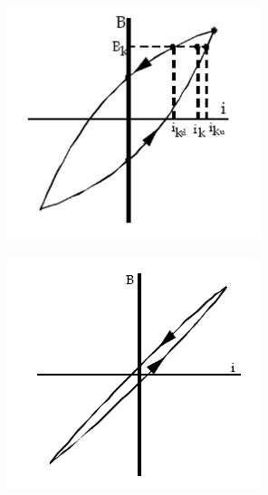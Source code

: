 \documentclass{../lab}
\begin{document}
\begin{figure}[h]
\begin{minipage}[t]{.5\textwidth}
    \centering
    \href{http://experimentationlab.berkeley.edu/sites/default/files/images/280px-BRAimage028.gif}{\includegraphics[width=0.9\linewidth,keepaspectratio]{images/280px-BRAimage028.png}}
    \caption{}
    \label{fig:Spectrum1}
\end{minipage}%
\begin{minipage}[t]{.5\textwidth}
    \centering
    \href{http://experimentationlab.berkeley.edu/sites/default/files/images/BRAimage029.gif}{\includegraphics[width=0.9\linewidth,keepaspectratio]{images/BRAimage029.png}}
    \caption{}
    \label{fig:Spectrum2}
\end{minipage}
\end{figure}
\end{document}
